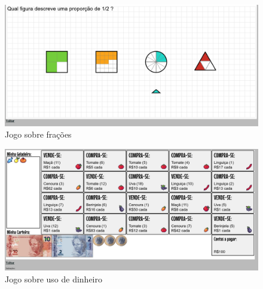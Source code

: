 \begin{figure}[H]
\includegraphics[width=\textwidth]{imgs/jogo1}
\caption{Jogo sobre frações}
\end{figure}


\begin{figure}[H]
\includegraphics[width=\textwidth]{imgs/jogo2}
\caption{Jogo sobre uso de dinheiro}
\end{figure}


